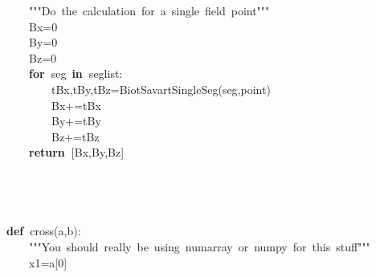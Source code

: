 \documentclass{article}
\newcommand{\hlstd}[1]{\textcolor[rgb]{0,0,0}{#1}}
\newcommand{\hlnum}[1]{\textcolor[rgb]{0.16,0.16,1}{#1}}
\newcommand{\hlstr}[1]{\textcolor[rgb]{1,0,0}{#1}}
\newcommand{\hlsym}[1]{\textcolor[rgb]{0,0,0}{#1}}
\newcommand{\hlkwa}[1]{\textcolor[rgb]{0,0,0}{\bf{#1}}}
\newcommand{\hlkwd}[1]{\textcolor[rgb]{0,0,0.51}{#1}}
\begin{document}
\hlstd{}\hlstd{\ \ \ \ }\hlstd{}\hlstr{"""Do\ the\ calculation\ for\ a\ single\ field\ point"""}\hlstd{\hspace*{\fill}\\
}\hlstd{\ \ \ \ }\hlstd{Bx}\hlsym{=}\hlstd{}\hlnum{0}\hspace*{\fill}\\
\hlstd{}\hlstd{\ \ \ \ }\hlstd{By}\hlsym{=}\hlstd{}\hlnum{0}\hspace*{\fill}\\
\hlstd{}\hlstd{\ \ \ \ }\hlstd{Bz}\hlsym{=}\hlstd{}\hlnum{0}\hspace*{\fill}\\
\hlstd{}\hlstd{\ \ \ \ }\hlstd{}\hlkwa{for\ }\hlstd{seg\ }\hlkwa{in\ }\hlstd{seglist}\hlsym{:}\hspace*{\fill}\\
\hlstd{}\hlstd{\ \ \ \ \ \ \ \ }\hlstd{tBx}\hlsym{,}\hlstd{tBy}\hlsym{,}\hlstd{tBz}\hlsym{=}\hlstd{}\hlkwd{\textunderscore Biot\textunderscore Savart\textunderscore SingleSeg}\hlstd{}\hlsym{(}\hlstd{seg}\hlsym{,}\hlstd{point}\hlsym{)}\hspace*{\fill}\\
\hlstd{}\hlstd{\ \ \ \ \ \ \ \ }\hlstd{Bx}\hlsym{+=}\hlstd{tBx\hspace*{\fill}\\
}\hlstd{\ \ \ \ \ \ \ \ }\hlstd{By}\hlsym{+=}\hlstd{tBy\hspace*{\fill}\\
}\hlstd{\ \ \ \ \ \ \ \ }\hlstd{Bz}\hlsym{+=}\hlstd{tBz\hspace*{\fill}\\
}\hlstd{\ \ \ \ }\hlstd{}\hlkwa{return\ }\hlstd{}\hlsym{{[}}\hlstd{Bx}\hlsym{,}\hlstd{By}\hlsym{,}\hlstd{Bz}\hlsym{{]}}\hspace*{\fill}\\
\hlstd{}\hspace*{\fill}\\
\hspace*{\fill}\\
\hspace*{\fill}\\
\hspace*{\fill}\\
\hlkwa{def\ }\hlstd{}\hlkwd{\textunderscore cross}\hlstd{}\hlsym{(}\hlstd{a}\hlsym{,}\hlstd{b}\hlsym{):}\hspace*{\fill}\\
\hlstd{}\hlstd{\ \ \ \ }\hlstd{}\hlstr{"""You\ should\ really\ be\ using\ numarray\ or\ numpy\ for\ this\ stuff"""}\hlstd{\hspace*{\fill}\\
}\hlstd{\ \ \ \ }\hlstd{x1}\hlsym{=}\hlstd{a}\hlsym{{[}}\hlstd{}\hlnum{0}\hlstd{}\hlsym{{]}}\hspace*{\fill}\\
\end{document}
